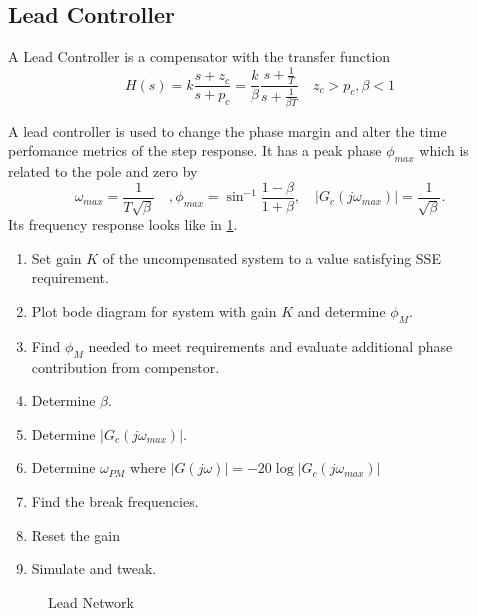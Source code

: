 \subsection{Lead Controller}
\begin{definition}
  A Lead Controller is a compensator with the transfer function
  \[
	H(s) = k\frac{s+z_c}{s+p_c} = \frac{k}{\beta}\frac{s+\frac{1}{T}}{s+\frac{1}{\beta T}} \quad z_c > p_c, \beta < 1
  \]
  \label{defn:lead-controller}
\end{definition}
A lead controller is used to change the phase margin and alter the time perfomance metrics of the step response. It has a peak phase $\phi_{max}$ which is related to the pole and zero by
\[
  \omega_{max} = \frac{1}{T\sqrt{\beta}}\quad, \phi_{max} = \sin^{-1}\frac{1-\beta}{1+\beta}, \quad |G_c(j\omega_{max})| = \frac{1}{\sqrt{\beta}}.
\]
Its frequency response looks like in \cref{fig:lead-network}.
\begin{enumerate}
  \item Set gain $K$ of the uncompensated system to a value satisfying SSE requirement.
  \item Plot bode diagram for system with gain $K$ and determine $\phi_M$.
  \item Find $\phi_{M}$ needed to meet requirements and evaluate additional phase contribution from compenstor.
  \item Determine $\beta$.
  \item Determine $|G_c(j\omega_{max})|$.
  \item Determine $\omega_{PM}$ where $|G(j\omega)| = -20\log|G_c(j\omega_{max})|$
  \item Find the break frequencies.
  \item Reset the gain
  \item Simulate and tweak.
\end{enumerate}
\begin{figure}
  \centering
  \caption{Lead Network}
  \label{fig:lead-network}
\end{figure}
